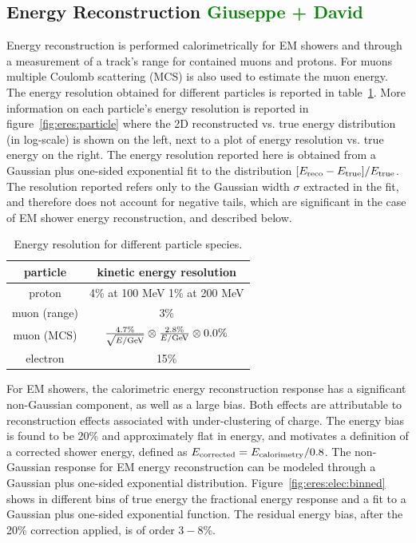 \documentclass[a4paper]{article}
\begin{document}
\newpage

\subsection{Energy Reconstruction \textcolor{green}{Giuseppe + David}}
\label{sec:ereco}
\par Energy reconstruction is performed calorimetrically for EM showers and through a measurement of a track's range for contained muons and protons. For muons multiple Coulomb scattering (MCS) is also used to estimate the muon energy. The energy resolution obtained for different particles is reported in table~\ref{tab:eres}. More information on each particle's energy resolution is reported in figure~\ref{fig:eres:particle} where the 2D reconstructed vs. true energy distribution (in log-scale) is shown on the left, next to a plot of energy resolution vs. true energy on the right. The energy resolution reported here is obtained from a Gaussian plus one-sided exponential fit to the distribution $[E_{\rm reco}-E_{\rm true}] / E_{\rm true}$. The resolution reported refers only to the Gaussian width $\sigma$ extracted in the fit, and therefore does not account for negative tails, which are significant in the case of EM shower energy reconstruction, and described below.


\begin{table}[H]
\centering
  \begin{tabular}{ | c | c |  }
    \hline
    particle & kinetic energy resolution  \\ \hline
    proton & 4\% at 100 MeV 1\% at 200 MeV \\ \hline
    muon (range) & 3\%  \\ \hline
    muon (MCS) & $\frac{4.7\%}{\sqrt{E/{\rm GeV}}} \otimes \frac{2.8\%}{E/{\rm GeV}} \otimes 0.0\%$  \\ \hline
    electron & 15\%  \\
    \hline
    
  \end{tabular}
  \caption{\label{tab:eres} Energy resolution for different particle species.}
 \end{table}
 
 \par For EM showers, the calorimetric energy reconstruction response has a significant non-Gaussian component, as well as a large bias. Both effects are attributable to reconstruction effects associated with under-clustering of charge. The energy bias is found to be 20\% and approximately flat in energy, and motivates a definition of a corrected shower energy, defined as $E_{\rm corrected} = E_{\rm calorimetry} / 0.8$. The non-Gaussian response for EM energy reconstruction can be modeled through a Gaussian plus one-sided exponential distribution. Figure~\ref{fig:eres:elec:binned} shows in different bins of true energy the fractional energy response and a fit to a Gaussian plus one-sided exponential function. The residual energy bias, after the 20\% correction applied, is of order $3-8$\%. 
 
\end{document}
